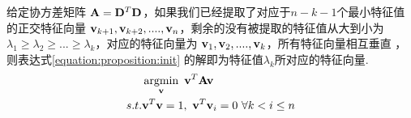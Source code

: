 \begin{proposition}
\label{prop:reverse}
给定协方差矩阵 ${\bf A} = {\bf D}^T{\bf D}$，如果我们已经提取了对应于$n-k-1$个最小特征值的正交特征向量 ${\bf v}_{k+1},{\bf v}_{k+2},....,{\bf v}_n$，剩余的没有被提取的特征值从大到小为 $\lambda_1 \geq \lambda_2 \geq ... \geq \lambda_k$，对应的特征向量为 ${\bf v}_1, {\bf v}_2,....,{\bf v}_k$，所有特征向量相互垂直 ，则表达式\ref{equation:proposition:init} 的解即为特征值$\lambda_k$所对应的特征向量.
\begin{equation}
\begin{split}
 & \operatorname*{arg min}_{{\bf v}}\ {\bf v}^T{\bf A}{\bf v}\\
 s.t. & {\bf v}^T{\bf v} =1,\ {\bf v}^T{\bf v}_i=0\ \forall k<i\leq n
\end{split}
\label{equation:proposition:init}
\end{equation}
\end{proposition}

